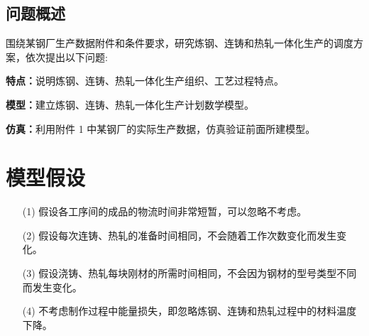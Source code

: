 \documentclass{whutmod}
\begin{document}
		\subsection{问题概述}
		    围绕某钢厂生产数据附件和条件要求，研究炼钢、连铸和热轧一体化生产的调度方案，依次提出以下问题:
				 
			
			\textbf{特点：}说明炼钢、连铸、热轧一体化生产组织、工艺过程特点。
			
			\textbf{模型：}建立炼钢、连铸、热轧一体化生产计划数学模型。
			
			\textbf{仿真：}利用附件 1 中某钢厂的实际生产数据，仿真验证前面所建模型。

	
	\section{模型假设}

\begin{itemize}                                             
	\item [(1)] 假设各工序间的成品的物流时间非常短暂，可以忽略不考虑。
	\item [(2)] 假设每次连铸、热轧的准备时间相同，不会随着工作次数变化而发生变化。
	\item [(3)] 假设浇铸、热轧每块刚材的所需时间相同，不会因为钢材的型号类型不同而发生变化。
	\item [(4)] 不考虑制作过程中能量损失，即忽略炼钢、连铸和热轧过程中的材料温度下降。
\end{itemize}



		
\end{document}
